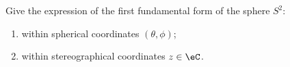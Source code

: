 \begin{exercice}\label{exo012}

 Give the expression of the first fundamental form of the sphere $S^2$:
\begin{enumerate}
\item within spherical coordinates $(\theta,\phi)$;
\item within stereographical coordinates $z\in\eC$.
\end{enumerate}
  
\end{exercice}
